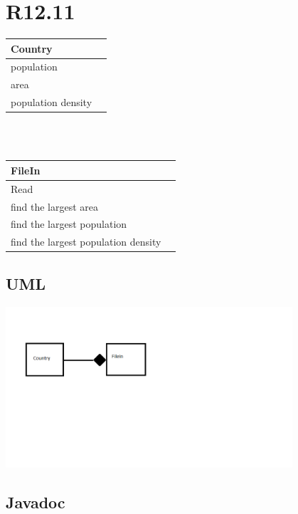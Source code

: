 \documentclass{article}
\begin{document}
\section{R12.11}
\begin{tabular}{lll|ll}
\hline
\multicolumn{5}{|l|}{Country}                         \\
\hline
\multicolumn{3}{|l|}{population} & \multicolumn{2}{l|}{} \\
\multicolumn{3}{|l|}{area} & \multicolumn{2}{l|}{} \\
\multicolumn{3}{|l|}{population density} & \multicolumn{2}{l|}{}\\
\hline
\end{tabular}
\\\\
\begin{tabular}{lll|ll}
\hline
\multicolumn{5}{|l|}{FileIn}                         \\
\hline
\multicolumn{3}{|l|}{Read} & \multicolumn{2}{l|}{} \\
\multicolumn{3}{|l|}{find the largest area} & \multicolumn{2}{l|}{} \\
\multicolumn{3}{|l|}{find the largest population} & \multicolumn{2}{l|}{}\\
\multicolumn{3}{|l|}{find the largest population density} & \multicolumn{2}{l|}{}\\
\hline
\end{tabular}
\subsection{UML}
\includegraphics[height=6cm]{Untitled.png}
\subsection{Javadoc}


\end{document}
